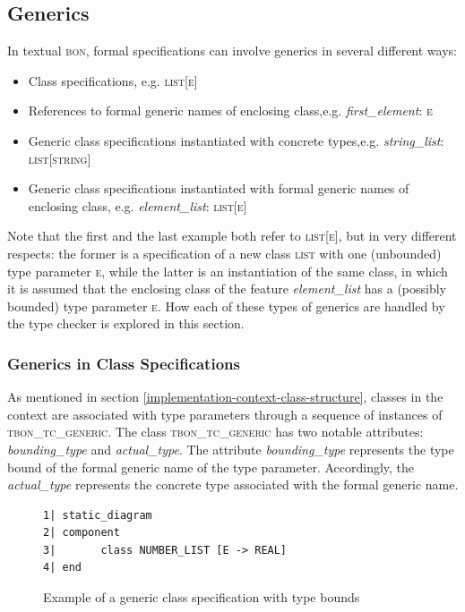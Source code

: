 \subsection{Generics}
\label{implementation-generics}
In textual \textsc{bon}, formal specifications can involve generics in several different ways:
\begin{itemize}
\item Class specifications, e.g. \textsc{list}[\textsc{e}]
\item References to formal generic names of enclosing class,\newline e.g. \textit{first\_element}: \textsc{e}
\item Generic class specifications instantiated with concrete types,\newline e.g. \textit{string\_list}: \textsc{list}[\textsc{string}]
\item Generic class specifications instantiated with formal generic names of enclosing class, e.g.  \textit{element\_list}: \textsc{list}[\textsc{e}]
\end{itemize}
Note that the first and the last example both refer to \textsc{list}[\textsc{e}], but in very different respects: the former is a specification of a new class \textsc{list} with one (unbounded) type parameter \textsc{e}, while the latter is an instantiation of the same class, in which it is assumed that the enclosing class of the feature \textit{element\_list} has a (possibly bounded) type parameter \textsc{e}. How each of these types of generics are handled by the type checker is explored in this section.
\subsubsection{Generics in Class Specifications}
As mentioned in section \ref{implementation-context-class-structure}, classes in the context are associated with type parameters through a sequence of instances of \textsc{tbon}\_\textsc{tc}\_\textsc{generic}. The class \textsc{tbon}\_\textsc{tc}\_\textsc{generic} has two notable attributes: \textit{bounding\_type} and \textit{actual\_type}. The attribute \textit{bounding\_type} represents the type bound of the formal generic name of the type parameter. Accordingly, the \textit{actual\_type} represents the concrete type associated with the formal generic name.

\begin{figure}[H]
{\footnotesize
\begin{verbatim}
1| static_diagram
2| component
3|       class NUMBER_LIST [E -> REAL]
4| end
\end{verbatim}
}
\caption{Example of a generic class specification with type bounds}
\label{fig:generic_class_specification_bounded}
\end{figure}

